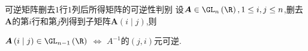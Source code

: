 \begin{corollary}{可逆矩阵删去$1$行$1$列后所得矩阵的可逆性判别}{}
	设$\boldsymbol{A}\in\GL_{n}\left(\R\right),1\leq i,j\leq n$,删去$\boldsymbol{A}$的第$i$行和第$j$列得到子矩阵$\boldsymbol{A}\left(i\mid  j\right)$,则
	\begin{center}
		$\boldsymbol{A}\left(i\mid j\right)\in\GL_{n-1}\left(\R\right)$ $\iff$ $A^{-1}$的$\left(j,i\right)$元可逆.
	\end{center}
\end{corollary}